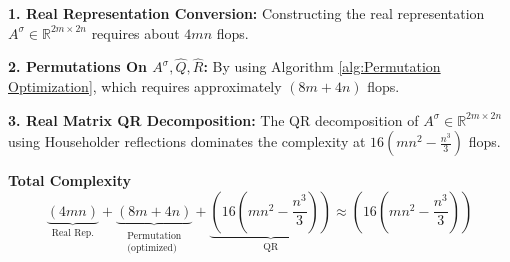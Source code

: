 \documentclass[12pt]{article}
\begin{document}
\textbf{1. Real Representation Conversion:}
Constructing the real representation $A^\sigma \in \mathbb{R}^{2m \times 2n}$ requires about $4mn$ flops. 

\textbf{2. Permutations On $A^\sigma, \widehat{Q}, \widehat{R}$:}
By using Algorithm \ref{alg:Permutation Optimization},  which requires approximately  $(8m+4n)$ flops.

\textbf{3. Real Matrix QR Decomposition:}
The QR decomposition of $A^\sigma \in \mathbb{R}^{2m \times 2n}$ using Householder reflections dominates the complexity at $16(mn^2-\frac{n^3}{3})$ flops.

\textbf{Total Complexity}
$$
\underbrace{(4mn)}_{\text{Real Rep.}} + \underbrace{(8m+4n)}_{\substack{\text{Permutation} \\ \text{(optimized)}}} + \underbrace{(16(mn^2-\frac{n^3}{3}))}_{\text{QR}} \approx \boxed{(16(mn^2-\frac{n^3}{3}))}
$$  
\end{document}
